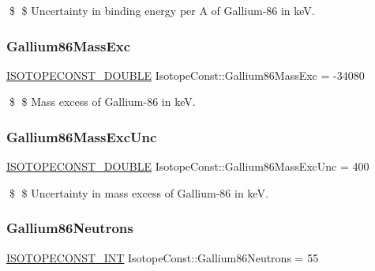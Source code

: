 \$ \$ Uncertainty in binding energy per A of Gallium-\/86 in keV. \mbox{\label{group___isotope_const-_gallium-_ga86_gaa484a3696349b45cf788c01b798f5ebd}} 
\subsubsection{\texorpdfstring{Gallium86\+Mass\+Exc}{Gallium86MassExc}}
{\footnotesize\ttfamily \mbox{\hyperlink{group___isotope_const-_macros_ga8f45a7272ce02c0b4c65c44636ed719a}{I\+S\+O\+T\+O\+P\+E\+C\+O\+N\+S\+T\+\_\+\+D\+O\+U\+B\+LE}} Isotope\+Const\+::\+Gallium86\+Mass\+Exc = -\/34080}

\$ \$ Mass excess of Gallium-\/86 in keV. \mbox{\label{group___isotope_const-_gallium-_ga86_ga1f95747f0d155fdfb9b049c8c3ed00bc}} 
\subsubsection{\texorpdfstring{Gallium86\+Mass\+Exc\+Unc}{Gallium86MassExcUnc}}
{\footnotesize\ttfamily \mbox{\hyperlink{group___isotope_const-_macros_ga8f45a7272ce02c0b4c65c44636ed719a}{I\+S\+O\+T\+O\+P\+E\+C\+O\+N\+S\+T\+\_\+\+D\+O\+U\+B\+LE}} Isotope\+Const\+::\+Gallium86\+Mass\+Exc\+Unc = 400}

\$ \$ Uncertainty in mass excess of Gallium-\/86 in keV. \mbox{\label{group___isotope_const-_gallium-_ga86_ga486fe2857b23f8c9b5a0756d82025533}} 
\subsubsection{\texorpdfstring{Gallium86\+Neutrons}{Gallium86Neutrons}}
{\footnotesize\ttfamily \mbox{\hyperlink{group___isotope_const-_macros_ga5f18360b3e99483a35c32d789e62621c}{I\+S\+O\+T\+O\+P\+E\+C\+O\+N\+S\+T\+\_\+\+I\+NT}} Isotope\+Const\+::\+Gallium86\+Neutrons = 55}


